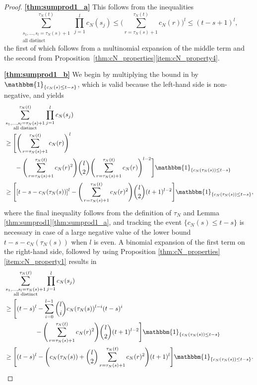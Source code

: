 \documentclass[12pt,authoryear]{article}
\theoremstyle{definition}
\newcommand{\1}[1]{\mathbbm{1}_{#1}}
\begin{document}
\begin{proof} \textbf{\ref{thm:sumprod1_a}}
This follows from the inequalities
\begin{equation*}
\sum_{\substack{ s_1, \dots, s_l =\tau_N(s) + 1 \\ \text{all distinct} }}^{\tau_N(t)}
        \prod_{j=1}^l c_N(s_j)
\leq \Bigg( \sum_{r=\tau_N(s) + 1}^{\tau_N(t)} c_N(r) \Bigg)^l \leq (t - s + 1)^l,
\end{equation*}
the first of which follows from a multinomial expansion of the middle term and the second from Proposition~\ref{thm:cN_properties}\ref{item:cN_property4}. 

\textbf{\ref{thm:sumprod1_b}}
We begin by multiplying the bound in \citet[Supplement, equation (8)]{koskela2022erratum} by $\1{\{ c_N(s) \leq t - s\}}$, which is valid because the left-hand side is non-negative, and yields  
\begin{align*}
&\sum_{\substack{ s_1, \dots, s_l =\tau_N(s) + 1 \\ \text{all distinct} }}^{\tau_N(t)} 
        \prod_{j=1}^l c_N(s_j) \\
&\geq \Bigg[ \Bigg( \sum_{r=\tau_N(s) + 1}^{\tau_N(t)} c_N(r) \Bigg)^l \\
&\phantom{\geq \Bigg[} - \Bigg( \sum_{r=\tau_N(s) + 1}^{\tau_N(t)} c_N(r)^2 \Bigg)
        \binom{l}{2} \Bigg( \sum_{r=\tau_N(s) + 1}^{\tau_N(t)} c_N(r) \Bigg)^{l-2} \Bigg] \1{\{ c_N(\tau_N(s)) \leq t - s\}} \\
&\geq \Bigg[[t - s - c_N(\tau_N(s))]^l - \Bigg( \sum_{r=\tau_N(s) + 1}^{\tau_N(t)} c_N(r)^2 \Bigg)
        \binom{l}{2} (t + 1)^{l-2}\Bigg]\1{\{c_N(\tau_N(s)) \leq t - s\}},
\end{align*}
where the final inequality follows from the definition of $\tau_N$ and Lemma \ref{thm:sumprod1}\ref{thm:sumprod1_a}, and tracking the event $\{c_N(s) \leq t - s\}$ is necessary in case of a large negative value of the lower bound $t - s - c_N(\tau_N(s))$ when $l$ is even.
A binomial expansion of the first term on the right-hand side, followed by using Proposition \ref{thm:cN_properties}\ref{item:cN_property1}  results in
\begin{align*}
&\sum_{\substack{ s_1, \dots, s_l =\tau_N(s) + 1 \\ \text{all distinct} }}^{\tau_N(t)} 
        \prod_{j=1}^l c_N(s_j) \\
&\geq \Bigg[(t - s)^l - \sum_{i = 0}^{l - 1} \binom{l}{i} c_N(\tau_N(s))^{l - i} (t - s)^i \\
&\phantom{\geq \Bigg[ (t - s)^l} - \Bigg( \sum_{r=\tau_N(s) + 1}^{\tau_N(t)} c_N(r)^2 \Bigg) \binom{l}{2} (t + 1)^{l-2}\Bigg]\1{\{c_N(\tau_N(s)) \leq t - s\}} \\
&\geq \Bigg[ (t - s)^l - \Bigg( c_N(\tau_N(s)) + \binom{l}{2} \sum_{r = \tau_N(s) + 1}^{\tau_N(t)} c_N(r)^2 \Bigg) (t + 1)^l \Bigg]\1{\{c_N(\tau_N(s)) \leq t - s\}}.
\end{align*}


\end{proof}
\end{document}
